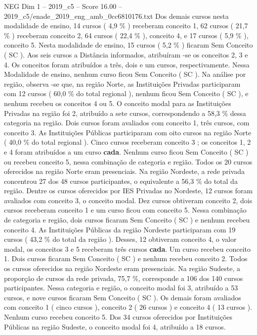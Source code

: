 \begin{textsample}{NEG Dim 1 – 2019\_c5 – Score 16.00 – 2019\_c5/enade\_2019\_eng\_amb\_0cc6810176.txt}
Dos demais cursos nesta modalidade de ensino, 14 cursos ( 4,9 \% ) receberam conceito 1, 62 cursos ( 21,7 \% ) receberam conceito 2, 64 cursos ( 22,4 \% ), conceito 4, e 17 cursos ( 5,9 \% ), conceito 5.
Nesta modalidade de ensino, 15 cursos ( 5,2 \% ) ficaram Sem Conceito ( SC ).
Aos seis cursos a Distância informados, atribuíram -se os conceitos 2, 3 e 4.
Os conceitos foram atribuídos a três, dois e um cursos, respectivamente.
Nessa Modalidade de ensino, nenhum curso ficou Sem Conceito ( SC ).
Na análise por região, observa -se que, na região Norte, as Instituições Privadas participaram com 12 cursos ( 60,0 \% do total regional ), nenhum ficou Sem Conceito ( SC ), e nenhum recebeu os conceitos 4 ou 5.
O conceito modal para as Instituições Privadas na região foi 2, atribuído a sete cursos, correspondendo a 58,3 \% dessa categoria na região.
Dois cursos foram avaliados com conceito 1, três cursos, com conceito 3.
As Instituições Públicas participaram com oito cursos na região Norte ( 40,0 \% do total regional ).
Cinco cursos receberam conceito 3 ; os conceitos 1, 2 e 4 foram atribuídos a um curso \textbf{cada}.
Nenhum curso ficou Sem Conceito ( SC ) ou recebeu conceito 5, nessa combinação de categoria e região.
Todos os 20 cursos oferecidos na região Norte eram presenciais.
Na região Nordeste, a rede privada concentrou 27 dos 48 cursos participantes, o equivalente a 56,3 \% do total da região.
Dentre os cursos oferecidos por IES Privadas no Nordeste, 12 cursos foram avaliados com conceito 3, o conceito modal.
Dez cursos obtiveram conceito 2, dois cursos receberam conceito 1 e um curso ficou com conceito 5.
Nessa combinação de categoria e região, dois cursos ficaram Sem Conceito ( SC ) e nenhum recebeu conceito 4.
As Instituições Públicas da região Nordeste participaram com 19 cursos ( 43,2 \% do total da região ).
Desses, 12 obtiveram conceito 4, o valor modal, os conceitos 3 e 5 receberam três cursos \textbf{cada}.
Um curso recebeu conceito 1.
Dois cursos ficaram Sem Conceito ( SC ) e nenhum recebeu conceito 2.
Todos os cursos oferecidos na região Nordeste eram presenciais.
Na região Sudeste, a proporção de cursos da rede privada, 75,7 \%, corresponde a 106 dos 140 cursos participantes.
Nessa categoria e região, o conceito modal foi 3, atribuído a 53 cursos, e nove cursos ficaram Sem Conceito ( SC ).
Os demais foram avaliados com conceito 1 ( cinco cursos ), conceito 2 ( 26 cursos ) e conceito 4 ( 13 cursos ).
Nenhum curso recebeu conceito 5.
Dos 34 cursos oferecidos por Instituições Públicas na região Sudeste, o conceito modal foi 4, atribuído a 18 cursos.

\end{textsample}
